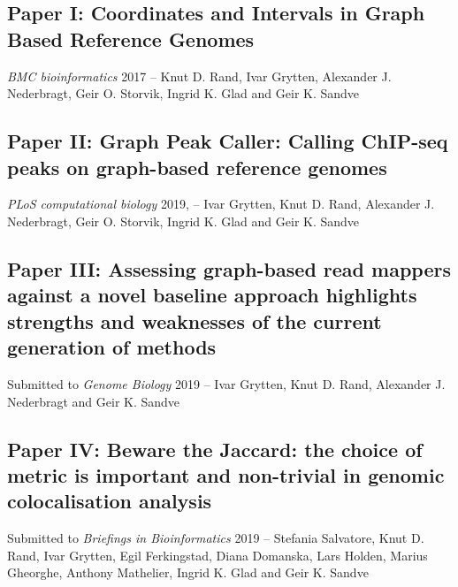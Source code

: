\subsection*{Paper I: Coordinates and Intervals in Graph Based Reference Genomes}
\emph{BMC bioinformatics} 2017 --
Knut D. Rand, Ivar Grytten, Alexander J. Nederbragt, Geir O. Storvik, Ingrid K. Glad and Geir K. Sandve


% 

\subsection*{Paper II: Graph Peak Caller: Calling ChIP-seq peaks on graph-based reference genomes}
\emph{PLoS computational biology} 2019, --
Ivar Grytten, Knut D. Rand, Alexander J. Nederbragt, Geir O. Storvik, Ingrid K. Glad and Geir K. Sandve


\subsection*{Paper III: Assessing graph-based read mappers against a novel baseline approach highlights strengths and weaknesses of the current generation of methods}
Submitted to \emph{Genome Biology} 2019 -- Ivar Grytten, Knut D. Rand, Alexander J. Nederbragt and Geir K. Sandve
\subsection*{Paper IV: Beware the Jaccard: the choice of metric is important and non-trivial in genomic colocalisation analysis}
Submitted to \emph{Briefings in Bioinformatics} 2019 -- Stefania Salvatore, Knut D. Rand, Ivar Grytten, Egil Ferkingstad, Diana Domanska, Lars Holden, Marius Gheorghe, Anthony Mathelier, Ingrid K. Glad and Geir K. Sandve

